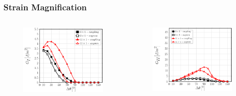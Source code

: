 \documentclass[first,firstsupp,lastsupp,last,hyperref,table]{ETHclass}
\begin{document}
\begin{frame}
\frametitle{\vspace{0.2cm}\small Strain Magnification}
\vspace{-1cm}
\centering
\begin{columns}[c]
\centering
\begin{column}{0.5\textwidth}
\centering
\begin{figure}
\centering
\includegraphics[width=\columnwidth]{nx1-coupling-vf60-GI-strainmagn11.pdf}
\end{figure}
\end{column}
\begin{column}{0.5\textwidth}
\centering
\begin{figure}
\centering
\includegraphics[width=\columnwidth]{nx1-coupling-vf60-GII-strainmagn11.pdf}

\end{figure}
\end{column}
\end{columns}
\end{frame}
\end{document}
